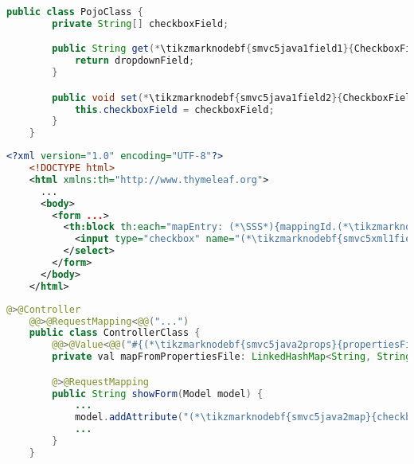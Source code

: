 \enlargethispage{10mm}
\begin{lstlisting}[language=Java, title={POJO class with one array field}]
    public class PojoClass {
        private String[] checkboxField;

        public String get(*\tikzmarknodebf{smvc5java1field1}{CheckboxField}*)() {
            return dropdownField;
        }

        public void set(*\tikzmarknodebf{smvc5java1field2}{CheckboxField}*)(String[] checkboxField) {
            this.checkboxField = checkboxField;
        }
    }
\end{lstlisting}
\begin{lstlisting}[language=XML, title={HTML form setting the field}]
    <?xml version="1.0" encoding="UTF-8"?>
    <!DOCTYPE html>
    <html xmlns:th="http://www.thymeleaf.org">
      ...
      <body>
        <form ...>
          <th:block th:each="mapEntry: (*\SSS*){mappingId.(*\tikzmarknodebf{smvc5xml1map}{checkboxMap}[ForestGreen]*).entrySet()}">
            <input type="checkbox" name="(*\tikzmarknodebf{smvc5xml1field}{checkboxField}[ForestGreen]*)" th:value="(*\SSS*){mapEntry.key}"><span th:text="(*\SSS*){mapEntry.value}"/><br/>
          </select>
        </form>
      </body>
    </html>
\end{lstlisting}
\begin{lstlisting}[language=Java, title={Controller converting \textit{properties} file to a map}]
    @>@Controller
    @@>@RequestMapping<@@("...")
    public class ControllerClass {
        @@>@Value<@@("#{(*\tikzmarknodebf{smvc5java2props}{propertiesFileId}[ForestGreen]*)}") // Parsing the properties file
        private val mapFromPropertiesFile: LinkedHashMap<String, String>;

        @>@RequestMapping
        public String showForm(Model model) {
            ...
            model.addAttribute("(*\tikzmarknodebf{smvc5java2map}{checkboxMap}[ForestGreen]*)", mapFromPropertiesFile)
            ...
        }
    }
\end{lstlisting}
\newpage

